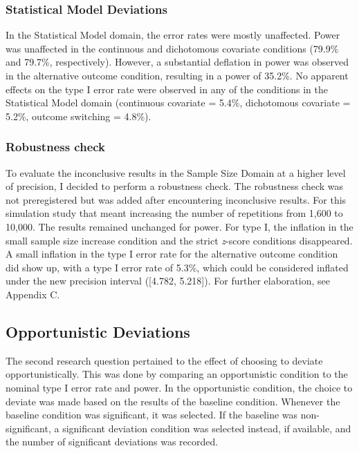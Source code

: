 \documentclass[
  man,
  floatsintext,
  longtable,
  nolmodern,
  notxfonts,
  notimes,
  colorlinks=true,linkcolor=blue,citecolor=blue,urlcolor=blue]{apa7}
\begin{document}
\subsubsection{Statistical Model
Deviations}\label{statistical-model-deviations-1}

In the Statistical Model domain, the error rates were mostly unaffected.
Power was unaffected in the continuous and dichotomous covariate
conditions (79.9\% and 79.7\%, respectively). However, a substantial
deflation in power was observed in the alternative outcome condition,
resulting in a power of 35.2\%. No apparent effects on the type I error
rate were observed in any of the conditions in the Statistical Model
domain (continuous covariate = 5.4\%, dichotomous covariate = 5.2\%,
outcome switching = 4.8\%).

\subsubsection{Robustness check}\label{robustness-check}

To evaluate the inconclusive results in the Sample Size Domain at a
higher level of precision, I decided to perform a robustness check. The
robustness check was not preregistered but was added after encountering
inconclusive results. For this simulation study that meant increasing
the number of repetitions from 1,600 to 10,000. The results remained
unchanged for power. For type I, the inflation in the small sample size
increase condition and the strict \emph{z}-score conditions disappeared.
A small inflation in the type I error rate for the alternative outcome
condition did show up, with a type I error rate of 5.3\%, which could be
considered inflated under the new precision interval ({[}4.782,
5.218{]}). For further elaboration, see Appendix C.

\subsection{Opportunistic Deviations}\label{opportunistic-deviations}

The second research question pertained to the effect of choosing to
deviate opportunistically. This was done by comparing an opportunistic
condition to the nominal type I error rate and power. In the
opportunistic condition, the choice to deviate was made based on the
results of the baseline condition. Whenever the baseline condition was
significant, it was selected. If the baseline was non-significant, a
significant deviation condition was selected instead, if available, and
the number of significant deviations was recorded.
\end{document}
